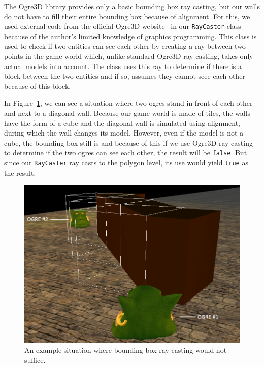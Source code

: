 The Ogre3D library provides only a basic bounding box ray casting, but our walls do not have to fill their entire bounding box because of
alignment. For this, we used external code from the official Ogre3D website~\cite{Ogre3DRaycasting} in our \texttt{RayCaster} class
because of the author's limited knowledge of graphics programming. This class is used to check if two entities can see each other by creating
a ray between two points in the game world which, unlike standard Ogre3D ray casting, takes only actual models into account. The class
uses this ray to determine if there is a block between the two entities and if so, assumes they cannot seee each other because of this
block.

In Figure~\ref{los-problem}, we can see a situation where two ogres stand in front of each other and next to a diagonal wall. Because our
game world is made of tiles, the walls have the form of a cube and the diagonal wall is simulated using alignment, during which the wall
changes its model. However, even if the model is not a cube, the bounding box still is and because of this if we use Ogre3D ray casting
to determine if the two ogres can see each other, the result will be \texttt{false}. But since our \texttt{RayCaster} ray casts to
the polygon level, its use would yield \texttt{true} as the result.

\begin{figure}[h]
    \centering
    \includegraphics[width=\columnwidth]{../img/los-problem.png}
    \caption{An example situation where bounding box ray casting would not suffice.}
    \label{los-problem}
\end{figure}

